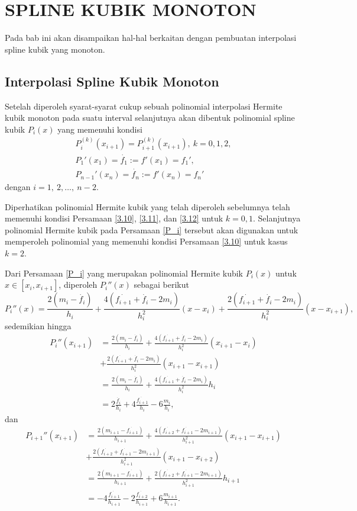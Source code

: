 \chapter{SPLINE KUBIK MONOTON}
Pada bab ini akan disampaikan hal-hal berkaitan dengan pembuatan interpolasi spline kubik yang monoton. 

\section{Interpolasi Spline Kubik Monoton}

Setelah diperoleh syarat-syarat cukup sebuah polinomial interpolasi Hermite kubik monoton pada suatu interval selanjutnya akan dibentuk polinomial spline kubik $P_i(x)$ yang memenuhi kondisi
\begin{align}
    P_i^{(k)}(x_{i+1}) = P_{i+1}^{(k)}(x_{i+1}), \: k=0,1,2,\label{3.10} \\
    P_1'(x_1) = \dot{f_1} := f'(x_1) = f_1', \label{3.11} \\
    P_{n-1}'(x_n) = \dot{f_n} := f'(x_n) = f_n' \label{3.12}
\end{align}
dengan $i=1,~2,\dots,~n-2$.

Diperhatikan polinomial Hermite kubik yang telah diperoleh sebelumnya telah memenuhi kondisi Persamaan \eqref{3.10}, \eqref{3.11}, dan \eqref{3.12} untuk $k=0,1$. Selanjutnya polinomial Hermite kubik pada Persamaan \eqref{P_i} tersebut akan digunakan untuk memperoleh polinomial yang memenuhi kondisi Persamaan \eqref{3.10} untuk kasus $k=2$.

Dari Persamaan \eqref{P_i} yang merupakan polinomial Hermite kubik $P_i(x)$ untuk $x \in [x_i,x_{i+1}]$, diperoleh $P_i''(x)$ sebagai berikut
\begin{equation}
    P_i''(x) = \frac{2(m_i-\dot{f_i})}{h_i} + \frac{4(\dot{f_{i+1}}+\dot{f_i}-2m_i)}{h_i^2}(x-x_i) +\frac{2(\dot{f_{i+1}}+\dot{f_i}-2m_i)}{h_i^2}(x-x_{i+1}),
\end{equation}
sedemikian hingga
\begin{align*}
    P_i''(x_{i+1}) &= \frac{2(m_i-\dot{f_i})}{h_i} + \frac{4(\dot{f_{i+1}}+\dot{f_i}-2m_i)}{h_i^2}(x_{i+1}-x_i) \\
    &+\frac{2(\dot{f_{i+1}}+\dot{f_i}-2m_i)}{h_i^2}(x_{i+1}-x_{i+1})\\
    &=\frac{2(m_i-\dot{f_i})}{h_i}+\frac{4(\dot{f_{i+1}}+\dot{f_i}-2m_i)}{h_i^2}h_i\\
    &=2\frac{\dot{f_i}}{h_i} + 4\frac{\dot{f_{i+1}}}{h_i} - 6\frac{m_i}{h_i},
\end{align*}
dan
\begin{align*}
    P_{i+1}''(x_{i+1}) &= \frac{2(m_{i+1}-\dot{f_{i+1}})}{h_{i+1}} + \frac{4(\dot{f_{i+2}}+\dot{f_{i+1}}-2m_{i+1})}{h_{i+1}^2}(x_{i+1}-x_{i+1}) \\
    &+\frac{2(\dot{f_{i+2}}+\dot{f_{i+1}}-2m_{i+1})}{h_{i+1}^2}(x_{i+1}-x_{i+2})\\
    &=\frac{2(m_{i+1}-\dot{f_{i+1}})}{h_{i+1}}+\frac{2(\dot{f_{i+2}}+\dot{f_{i+1}}-2m_{i+1})}{h_{i+1}^2}h_{i+1}\\
    &=-4\frac{\dot{f_{i+1}}}{h_{i+1}} - 2\frac{\dot{f_{i+2}}}{h_{i+1}} + 6\frac{m_{i+1}}{h_{i+1}}.
\end{align*}

